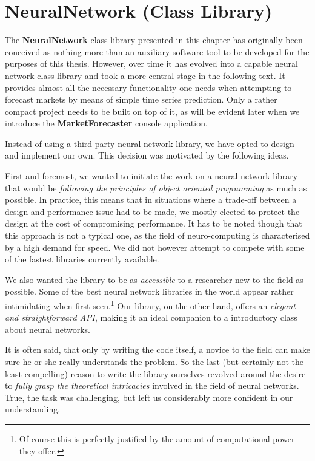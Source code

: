 \chapter{NeuralNetwork (Class Library)}

The \textbf{NeuralNetwork} class library presented in this chapter has originally been conceived as nothing more than an auxiliary software tool to be developed for the purposes of this thesis. However, over time it has evolved into a capable neural network class library and took a more central stage in the following text. It provides almost all the necessary functionality one needs when attempting to forecast markets by means of simple time series prediction. Only a rather compact project needs to be built on top of it, as will be evident later when we introduce the \textbf{MarketForecaster} console application.

Instead of using a third-party neural network library, we have opted to design and implement our own. This decision was motivated by the following ideas.

First and foremost, we wanted to initiate the work on a neural network library that would be \textit{following the principles of object oriented programming} as much as possible. In practice, this means that in situations where a trade-off between a design and performance issue had to be made, we mostly elected to protect the design at the cost of compromising performance. It has to be noted though that this approach is not a typical one, as the field of neuro-computing is characterised by a high demand for speed. We did not however attempt to compete with some of the fastest libraries currently available.

We also wanted the library to be as \textit{accessible} to a researcher new to the field as possible. Some of the best neural network libraries in the world appear rather intimidating when first seen.\footnote{Of course this is perfectly justified by the amount of computational power they offer.} Our library, on the other hand, offers an \textit{elegant and straightforward API}, making it an ideal companion to a introductory class about neural networks.

It is often said, that only by writing the code itself, a novice to the field can make sure he or she really understands the problem. So the last (but certainly not the least compelling) reason to write the library ourselves revolved around the desire to \textit{fully grasp the theoretical intricacies} involved in the field of neural networks. True, the task was challenging, but left us considerably more confident in our understanding.

